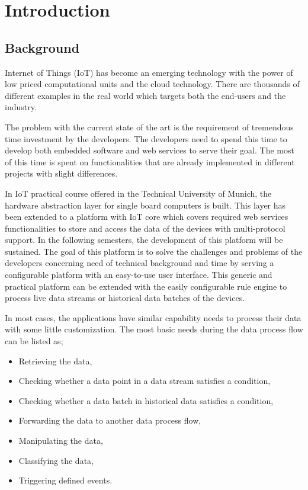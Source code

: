 
\chapter{Introduction}\label{chapter:introduction}

\section{Background}
\label{background}
Internet of Things (IoT) has become an emerging technology with the power of low priced computational units and the cloud technology. There are thousands of different examples in the real world which targets both the end-users and the industry. 

The problem with the current state of the art is the requirement of tremendous time investment by the developers. The developers need to spend this time to develop both embedded software and web services to serve their goal. The most of this time is spent on functionalities that are already implemented in different projects with slight differences.

In IoT practical course offered in the Technical University of Munich, the hardware abstraction layer for single board computers is built. This layer has been extended to a platform with IoT core which covers required web services functionalities to store and access the data of the devices with multi-protocol support. In the following semesters, the development of this platform will be sustained. The goal of this platform is to solve the challenges and problems of the developers concerning need of technical background and time by serving a configurable platform with an easy-to-use user interface. This generic and practical platform can be extended with the easily configurable rule engine to process live data streams or historical data batches of the devices.

In most cases, the applications have similar capability needs to process their data with some little customization. The most basic needs during the data process flow can be listed as;
\begin{itemize}
  \item Retrieving the data,
  \item Checking whether a data point in a data stream satisfies a condition,
  \item Checking whether a data batch in historical data satisfies a condition,
  \item Forwarding the data to another data process flow,
  \item Manipulating the data,
  \item Classifying the data,
  \item Triggering defined events.
\end{itemize}

